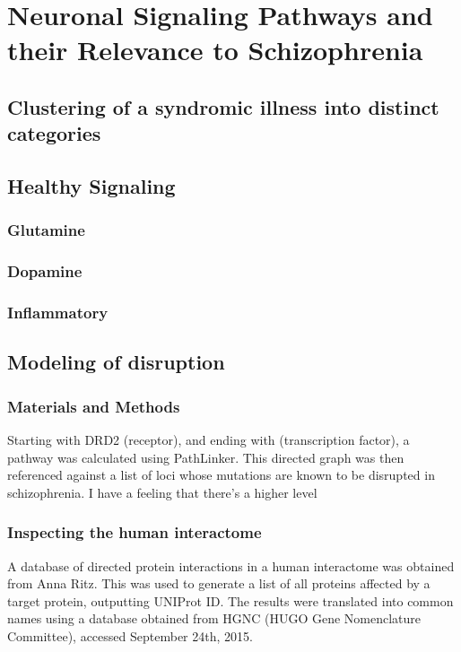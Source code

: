 \documentclass[12pt,twoside]{reedthesis}
\begin{document}
\chapter{Neuronal Signaling Pathways and their Relevance to Schizophrenia}
	\section{Clustering of a syndromic illness into distinct categories}
	\section{Healthy Signaling}
		\subsection{Glutamine}
		\subsection{Dopamine}
		\subsection{Inflammatory}
	\section{Modeling of disruption}
		\subsection{Materials and Methods}
		Starting with DRD2 (receptor), and ending with (transcription factor), a pathway was calculated using PathLinker. This directed graph was then referenced against a list of loci whose mutations are known to be disrupted in schizophrenia. I have a feeling that there's a higher level 
		\subsection{Inspecting the human interactome} 
		A database of directed protein interactions in a human interactome was obtained from Anna Ritz. This was used to generate a list of all proteins affected by a target protein, outputting UNIProt ID. The results were translated into common names using a database obtained from HGNC (HUGO Gene Nomenclature Committee), accessed September 24th, 2015. 
\end{document}
